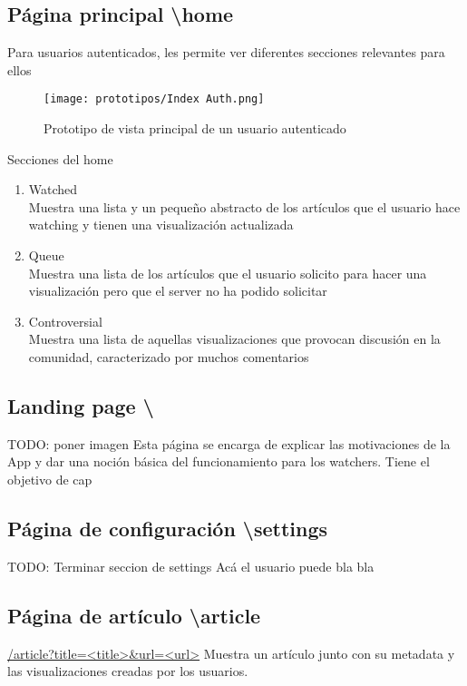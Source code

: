 \subsection{Página principal \textbackslash home}
Para usuarios autenticados, les permite ver diferentes secciones relevantes para ellos

\begin{figure}[H]
    \centering
    \texttt{[image: prototipos/Index Auth.png]}
    \caption{Prototipo de vista principal de un usuario autenticado}
    \label{PrototipoHomePage}
\end{figure}


Secciones del home
\begin{enumerate}
    \item Watched \\ Muestra una lista y un pequeño abstracto de los artículos que el usuario hace watching y tienen una visualización actualizada
    \item Queue \\ Muestra una lista de los artículos que el usuario solicito para hacer una visualización pero que el server no ha podido solicitar
    \item Controversial \\ Muestra una lista de aquellas visualizaciones que provocan discusión en la comunidad, caracterizado por muchos comentarios
\end{enumerate}

\subsection{Landing page \textbackslash}
TODO: poner imagen
Esta página se encarga de explicar las motivaciones de la App y dar una noción básica del funcionamiento para los watchers.
Tiene el objetivo de cap

\subsection{Página de configuración \textbackslash settings}
TODO: Terminar seccion de settings
Acá el usuario puede bla bla

\subsection{Página de artículo \textbackslash article}
\url{/article?title=<title>&url=<url>}
Muestra un artículo junto con su metadata y las visualizaciones creadas por los usuarios.

